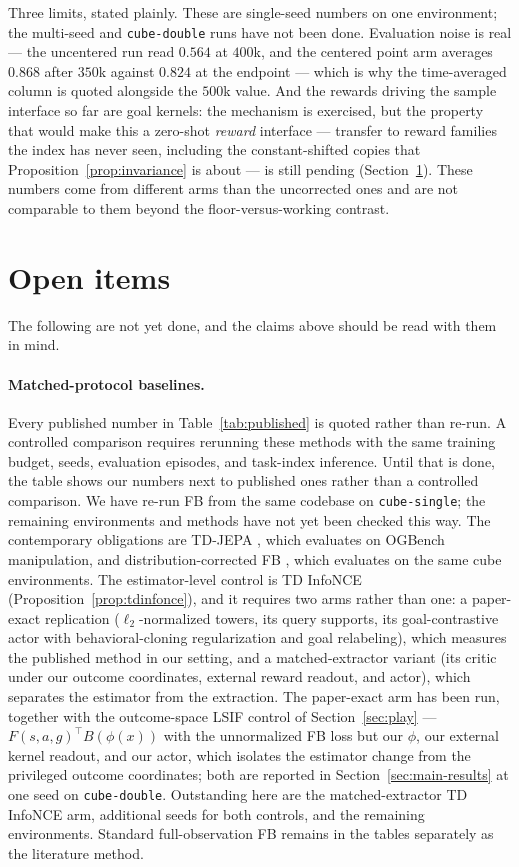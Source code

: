 \documentclass{article}
\begin{document}
Three limits, stated plainly.
These are single-seed numbers on one environment; the multi-seed and \texttt{cube-double} runs have not been done.
Evaluation noise is real --- the uncentered run read $0.564$ at $400$k, and the centered point arm averages $0.868$ after $350$k against $0.824$ at the endpoint --- which is why the time-averaged column is quoted alongside the $500$k value.
And the rewards driving the sample interface so far are goal kernels: the mechanism is exercised, but the property that would make this a zero-shot \emph{reward} interface --- transfer to reward families the index has never seen, including the constant-shifted copies that Proposition~\ref{prop:invariance} is about --- is still pending (Section~\ref{sec:todo}).
These numbers come from different arms than the uncorrected ones and are not comparable to them beyond the floor-versus-working contrast.

\section{Open items}
\label{sec:todo}

The following are not yet done, and the claims above should be read with them in mind.

\paragraph{Matched-protocol baselines.}
Every published number in Table~\ref{tab:published} is quoted rather than re-run.
A controlled comparison requires rerunning these methods with the same training budget, seeds, evaluation episodes, and task-index inference.
Until that is done, the table shows our numbers next to published ones rather than a controlled comparison.
We have re-run FB from the same codebase on \texttt{cube-single}; the remaining environments and methods have not yet been checked this way.
The contemporary obligations are TD-JEPA \citep{bagatella-iclr26a}, which evaluates on OGBench manipulation, and distribution-corrected FB \citep{asadulaev2026zol}, which evaluates on the same cube environments.
The estimator-level control is TD InfoNCE (Proposition~\ref{prop:tdinfonce}), and it requires two arms rather than one: a paper-exact replication ($\ell_2$-normalized towers, its query supports, its goal-contrastive actor with behavioral-cloning regularization and goal relabeling), which measures the published method in our setting, and a matched-extractor variant (its critic under our outcome coordinates, external reward readout, and actor), which separates the estimator from the extraction.
The paper-exact arm has been run, together with the outcome-space LSIF control of Section~\ref{sec:play} --- $F(s,a,g)^\top B(\phi(x))$ with the unnormalized FB loss but our $\phi$, our external kernel readout, and our actor, which isolates the estimator change from the privileged outcome coordinates; both are reported in Section~\ref{sec:main-results} at one seed on \texttt{cube-double}.
Outstanding here are the matched-extractor TD InfoNCE arm, additional seeds for both controls, and the remaining environments.
Standard full-observation FB remains in the tables separately as the literature method.
\end{document}
